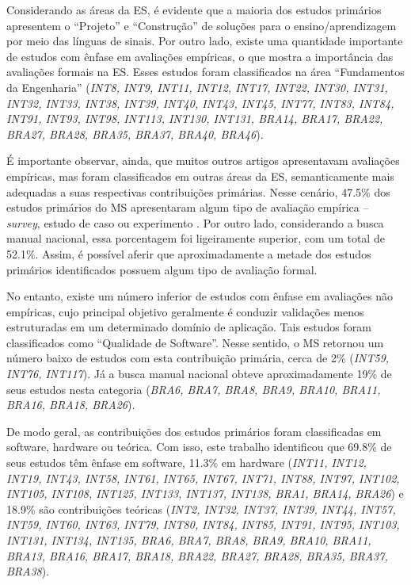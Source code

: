 Considerando as áreas da ES, é evidente que a maioria dos estudos primários apresentem o ``Projeto'' e ``Construção'' de soluções para o ensino/aprendizagem por meio das línguas de sinais. Por outro lado, existe uma quantidade importante de estudos com ênfase em avaliações empíricas, o que mostra a importância das avaliações formais na ES. Esses estudos foram classificados na área ``Fundamentos da Engenharia'' (\textit{INT8, INT9, INT11, INT12, INT17, INT22, INT30, INT31, INT32, INT33, INT38, INT39, INT40, INT43, INT45, INT77, INT83, INT84, INT91, INT93, INT98, INT113, INT130, INT131, BRA14, BRA17, BRA22, BRA27, BRA28, BRA35, BRA37, BRA40, BRA46}).

É importante observar, ainda, que muitos outros artigos apresentavam avaliações empíricas, mas foram classificados em outras áreas da ES, semanticamente mais adequadas a suas respectivas contribuições primárias. Nesse cenário, 47.5\% dos estudos primários do MS apresentaram algum tipo de avaliação empírica -- \textit{survey}, estudo de caso ou experimento \cite{Wohlin2012}. Por outro lado, considerando a busca manual nacional, essa porcentagem foi ligeiramente superior, com um total de 52.1\%. Assim, é possível aferir que aproximadamente a metade dos estudos primários identificados possuem algum tipo de avaliação formal.

No entanto, existe um número inferior de estudos com ênfase em avaliações não empíricas, cujo principal objetivo geralmente é conduzir validações menos estruturadas em um determinado domínio de aplicação. Tais estudos foram classificados como ``Qualidade de Software''. Nesse sentido, o MS retornou um número baixo de estudos com esta contribuição primária, cerca de 2\% (\textit{INT59, INT76, INT117}). Já a busca manual nacional obteve aproximadamente 19\% de seus estudos nesta categoria (\textit{BRA6, BRA7, BRA8, BRA9, BRA10, BRA11, BRA16, BRA18, BRA26}).%

De modo geral, as contribuições dos estudos primários foram classificadas em software, hardware ou teórica. Com isso, este trabalho identificou que 69.8\% de seus estudos têm ênfase em software, 11.3\% em hardware (\textit{INT11, INT12, INT19, INT43, INT58, INT61, INT65, INT67, INT71, INT88, INT97, INT102, INT105, INT108, INT125, INT133, INT137, INT138, BRA1, BRA14, BRA26}) e 18.9\% são contribuições teóricas (\textit{INT2, INT32, INT37, INT39, INT44, INT57, INT59, INT60, INT63, INT79, INT80, INT84, INT85, INT91, INT95, INT103, INT131, INT134, INT135, BRA6, BRA7, BRA8, BRA9, BRA10, BRA11, BRA13, BRA16, BRA17, BRA18, BRA22, BRA27, BRA28, BRA35, BRA37, BRA38}).

